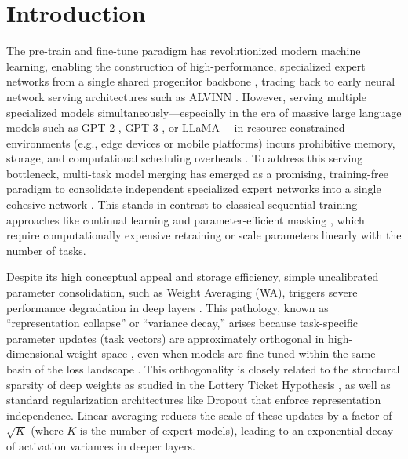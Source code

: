 \documentclass{article}
\theoremstyle{plain}
\theoremstyle{definition}
\theoremstyle{remark}
\begin{document}
\section{Introduction}
\label{submission-instructions}
The pre-train and fine-tune paradigm has revolutionized modern machine learning, enabling the construction of high-performance, specialized expert networks from a single shared progenitor backbone \cite{he16resnet, devlin18bert, vaswani17transformer}, tracing back to early neural network serving architectures such as ALVINN \cite{pomerleau89alvinn}. However, serving multiple specialized models simultaneously---especially in the era of massive large language models such as GPT-2 \cite{radford19gpt2}, GPT-3 \cite{brown20gpt3}, or LLaMA \cite{touvron23llama}---in resource-constrained environments (e.g., edge devices or mobile platforms) incurs prohibitive memory, storage, and computational scheduling overheads \cite{dettmers22llmint8, frantar23gptq}. To address this serving bottleneck, multi-task model merging has emerged as a promising, training-free paradigm to consolidate independent specialized expert networks into a single cohesive network \cite{wortsman22model, ilharco22editing}. This stands in contrast to classical sequential training approaches like continual learning \cite{kirkpatrick17ewc, zenke17si, schwarz18progressive} and parameter-efficient masking \cite{mallya18packnet}, which require computationally expensive retraining or scale parameters linearly with the number of tasks.

Despite its high conceptual appeal and storage efficiency, simple uncalibrated parameter consolidation, such as Weight Averaging (WA), triggers severe performance degradation in deep layers \cite{jordan23repair}. This pathology, known as ``representation collapse'' or ``variance decay,'' arises because task-specific parameter updates (task vectors) are approximately orthogonal in high-dimensional weight space \cite{ortizjimenez23task}, even when models are fine-tuned within the same basin of the loss landscape \cite{ainsworth22git, entezari21permutation, wortsman21learning}. This orthogonality is closely related to the structural sparsity of deep weights as studied in the Lottery Ticket Hypothesis \cite{frankle18lottery}, as well as standard regularization architectures like Dropout \cite{srivastava14dropout} that enforce representation independence. Linear averaging reduces the scale of these updates by a factor of $\sqrt{K}$ (where $K$ is the number of expert models), leading to an exponential decay of activation variances in deeper layers.
\end{document}
